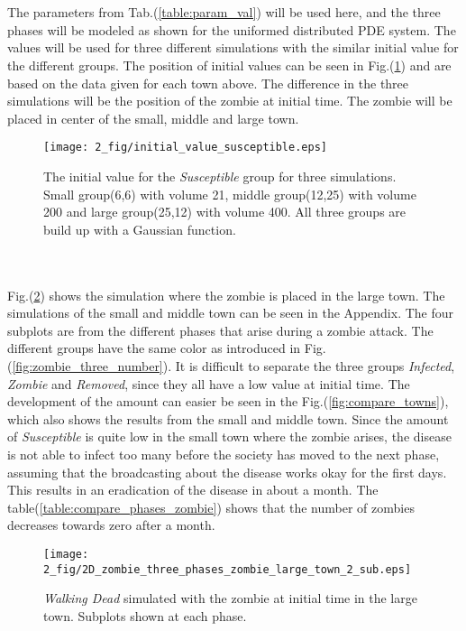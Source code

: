 \documentclass[%
twoside,                 %
final,                   %
chapterprefix=true,      %
open=right               %
10pt]{book}
\begin{document}
\noindent
\\
\\
The parameters from Tab.(\ref{table:param_val}) will be used here, and the three phases will be modeled as shown for the uniformed distributed PDE system. The values will be used for three different simulations with the similar initial value for the different groups. The position of initial values can be seen in Fig.(\ref{fig:initial_value_susceptible}) and are based on the data given for each town above. The difference in the three simulations will be the position of the zombie at initial time. The zombie will be placed in center of the small, middle and large town.


\begin{figure}[ht]
  \centerline{\texttt{[image: 2\_fig/initial\_value\_susceptible.eps]}}
  \caption{
  \label{fig:initial_value_susceptible} The initial value for the \emph{Susceptible} group for three simulations. Small group(6,6) with volume 21, middle group(12,25) with volume 200 and large group(25,12) with volume 400. All three groups are build up with a Gaussian function.
  }
\end{figure}


\\
\\
Fig.(\ref{fig:large_town}) shows the simulation where the zombie is placed in the large town. The simulations of the small and middle town can be seen in the Appendix. The four subplots are from the different phases that arise during a zombie attack. The different groups have the same color as introduced in Fig.(\ref{fig:zombie_three_number}). It is difficult to separate the three groups \emph{Infected}, \emph{Zombie} and \emph{Removed}, since they all have a low value at initial time. The development of the amount can easier be seen in the Fig.(\ref{fig:compare_towns}), which also shows the results from the small and middle town. Since the amount of \emph{Susceptible} is quite low in the small town where the zombie arises, the disease is not able to infect too many before the society has moved to the next phase, assuming that the broadcasting about the disease works okay for the first days. This results in an eradication of the disease in about a month. The table(\ref{table:compare_phases_zombie}) shows that the number of zombies decreases towards zero after a month. 


\begin{figure}[ht]
  \centerline{\texttt{[image: 2\_fig/2D\_zombie\_three\_phases\_zombie\_large\_town\_2\_sub.eps]}}
  \caption{
  \label{fig:large_town} \emph{Walking Dead} simulated with the zombie at initial time in the large town. Subplots shown at each phase.
  }
\end{figure}
\end{document}
